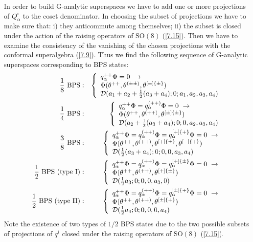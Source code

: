 \documentclass[a4paper,12pt]{article}
\begin{document}
In order to build G-analytic superspaces we have to add one or 
more projections of $Q^i_\alpha$ to the coset denominator. In 
choosing the subset of projections we have to make sure that: i) 
they anticommute among themselves; ii) the subset is closed under 
the action of the raising operators of $\mbox{SO}(8)$ 
(\ref{7.15}). Then we have to examine the consistency of the 
vanishing of the chosen projections with the conformal 
superalgebra (\ref{7.9}). Thus we find the following sequence of 
G-analytic superspaces corresponding to BPS states: 
\begin{eqnarray}
 {1\over 8}  \mbox{ BPS}: && \left\{
  \begin{array}{l}
    q_\alpha^{++}\Phi=0\ \rightarrow \\ 
    \Phi(\theta^{++},\theta^{(\pm\pm)},\theta^{[\pm]\{\pm\}})\\
    {\cal D}(a_1+a_2 + {1\over 2}(a_3+a_4);0;a_1,a_2,a_3,a_4) 
     \end{array}
 \right.\label{7.16}\\
 {1\over 4}  \mbox{ BPS}: &&\left\{
  \begin{array}{l}
    q_\alpha^{++}\Phi=q_\alpha^{(++)}\Phi=0\ \rightarrow \\ 
    \Phi(\theta^{++},\theta^{(++)},\theta^{[\pm]\{\pm\}})\\
    {\cal D}(a_2 + {1\over 2}(a_3+a_4);0;0,a_2,a_3,a_4)
      \end{array}
 \right. \label{7.17}\\
{3\over 8}  \mbox{ BPS}: &&\left\{ 
  \begin{array}{l}
    q_\alpha^{++}\Phi=q_\alpha^{(++)}\Phi=q_\alpha^{[+]\{+\}}\Phi=0\ \rightarrow \\ 
    \Phi(\theta^{++},\theta^{(++)},\theta^{[+]\{\pm\}},\theta^{[-]\{+\}})\\
    {\cal D}({1\over 2}(a_3+a_4);0;0,0,a_3,a_4)
  \end{array}
 \right. \label{7.18}\\
{1\over 2}  \mbox{ BPS (type I)}: &&\left\{ 
  \begin{array}{l}
    q_\alpha^{++}\Phi=q_\alpha^{(++)}\Phi=q_\alpha^{[+]\{\pm\}}\Phi=0\ \rightarrow \\ 
    \Phi(\theta^{++},\theta^{(++)},\theta^{[+]\{\pm\}})\\
    {\cal D}({1\over 2}a_3;0;0,0,a_3,0)
  \end{array}
 \right. \label{7.19}\\
{1\over 2}  \mbox{ BPS (type II)}: &&\left\{ 
  \begin{array}{l}
    q_\alpha^{++}\Phi=q_\alpha^{(++)}\Phi=q_\alpha^{[\pm]\{+\}}\Phi=0\ \rightarrow \\ 
    \Phi(\theta^{++},\theta^{(++)},\theta^{[\pm]\{+\}})\\
    {\cal D}({1\over 2}a_4;0;0,0,0,a_4)
  \end{array}
 \right. \label{7.20}
\end{eqnarray}
Note the existence of two types of $1/2$ BPS states due to the two 
possible subsets of projections of $q^i$ closed under the raising 
operators of $\mbox{SO}(8)$ (\ref{7.15}). 
\end{document}
